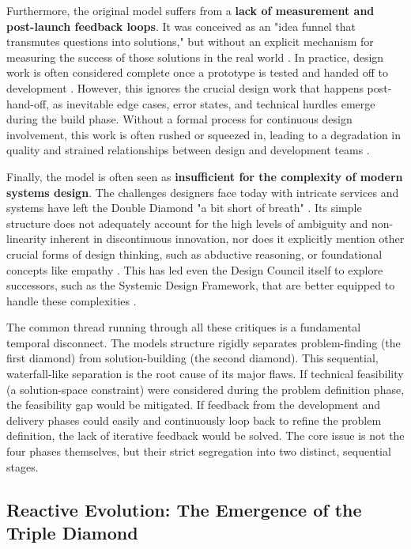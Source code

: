 \documentclass[
  12pt,
  a4paper,
  bibliography=totoc,
  numbers=noenddot
]{scrartcl}
\begin{document}
Furthermore, the original model suffers from a \textbf{lack of
measurement and post-launch feedback loops}. It was conceived as an
"idea funnel that transmutes questions into solutions," but without an
explicit mechanism for measuring the success of those solutions in the
real world \cite{medium2025double}. In practice, design work is often
considered complete once a prototype is tested and handed off to
development \cite{uxdesign2025why}. However, this ignores the crucial
design work that happens post-hand-off, as inevitable edge cases, error
states, and technical hurdles emerge during the build phase. Without a
formal process for continuous design involvement, this work is often
rushed or squeezed in, leading to a degradation in quality and strained
relationships between design and development teams \cite{uxdesign2025why}.

Finally, the model is often seen as \textbf{insufficient for the
complexity of modern systems design}. The challenges designers face
today with intricate services and systems have left the Double Diamond
"a bit short of breath" \cite{medium2025double}. Its simple structure does
not adequately account for the high levels of ambiguity and
non-linearity inherent in discontinuous innovation, nor does it
explicitly mention other crucial forms of design thinking, such as
abductive reasoning, or foundational concepts like
empathy \cite{researchgate2025design}. This has led even the Design Council itself
to explore successors, such as the Systemic Design Framework, that are
better equipped to handle these complexities \cite{medium2025double}.

The common thread running through all these critiques is a fundamental
temporal disconnect. The model\textquotesingle s structure rigidly
separates problem-finding (the first diamond) from solution-building
(the second diamond). This sequential, waterfall-like separation is the
root cause of its major flaws. If technical feasibility (a
solution-space constraint) were considered during the problem definition
phase, the feasibility gap would be mitigated. If feedback from the
development and delivery phases could easily and continuously loop back
to refine the problem definition, the lack of iterative feedback would
be solved. The core issue is not the four phases themselves, but their
strict segregation into two distinct, sequential stages.

\subsection{Reactive Evolution: The
Emergence of the Triple
Diamond}\label{reactive-evolution-the-emergence-of-the-triple-diamond}
\end{document}
